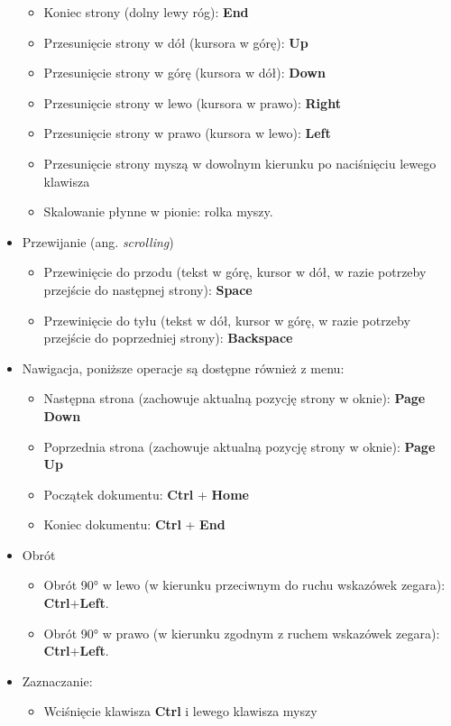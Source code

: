 \documentclass{mwart}
\def\key#1{\textbf{#1}}
\begin{document}
\begin{itemize}
\begin{itemize}
    \item Koniec strony (dolny lewy róg): \key{End}
    \item Przesunięcie strony w dół (kursora w górę): \key{Up}
    \item Przesunięcie strony w górę (kursora w dół): \key{Down}
    \item Przesunięcie strony w lewo (kursora w prawo): \key{Right}
    \item Przesunięcie strony w prawo (kursora w lewo): \key{Left}
    \item Przesunięcie strony myszą w dowolnym kierunku po naciśnięciu
lewego klawisza
   \item Skalowanie płynne w pionie: rolka myszy.
    \end{itemize}
  \item Przewijanie (ang. \textit{scrolling})
    \begin{itemize}
    \item Przewinięcie do przodu (tekst w górę, kursor w dół, w razie
potrzeby przejście do następnej strony): \key{Space}
    \item Przewinięcie do tyłu (tekst w dół, kursor w górę, w razie
potrzeby przejście do poprzedniej strony): \key{Backspace}
    \end{itemize}
  \item Nawigacja, poniższe operacje są dostępne również z menu:
    \begin{itemize}
    \item Następna strona (zachowuje aktualną pozycję strony w oknie): \key{Page Down}
    \item Poprzednia strona (zachowuje aktualną pozycję strony w oknie): \key{Page Up}
    \item Początek dokumentu: \key{Ctrl} + \key{Home}
    \item Koniec dokumentu: \key{Ctrl} + \key{End}
    \end{itemize}
  \item Obrót
    \begin{itemize}
    \item Obrót 90° w lewo (w kierunku przeciwnym do ruchu wskazówek
      zegara): \key{Ctrl}+\key{Left}.
    \item Obrót 90° w prawo (w kierunku zgodnym z ruchem wskazówek
      zegara): \key{Ctrl}+\key{Left}.
    \end{itemize}
  \item Zaznaczanie:
    \begin{itemize}
    \item Wciśnięcie klawisza \key{Ctrl} i lewego klawisza myszy

\end{itemize}
\end{itemize}
\end{document}
